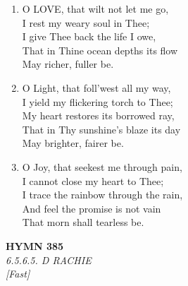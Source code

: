 \begin{enumerate}
    \item O LOVE, that wilt not let me go, \\
        I rest my weary soul in Thee; \\
        I give Thee back the life I owe, \\
        That in Thine ocean depths its flow \\
        May richer, fuller be.

    \item O Light, that foll'west all my way, \\
        I yield my flickering torch to Thee; \\
        My heart restores its borrowed ray, \\
        That in Thy sunshine's blaze its day \\
        May brighter, fairer be.

    \item O Joy, that seekest me through pain, \\
        I cannot close my heart to Thee; \\
        I trace the rainbow through the rain, \\
        And feel the promise is not vain \\
        That morn shall tearless be.

\end{enumerate}

\newpage
\begin{center}
    {\Large \textbf{HYMN 385}}
    \\
    \textit{6.5.6.5. D RACHIE}
    \\
    \textit{\small [Fast]}
\end{center}
\vspace{1em}


